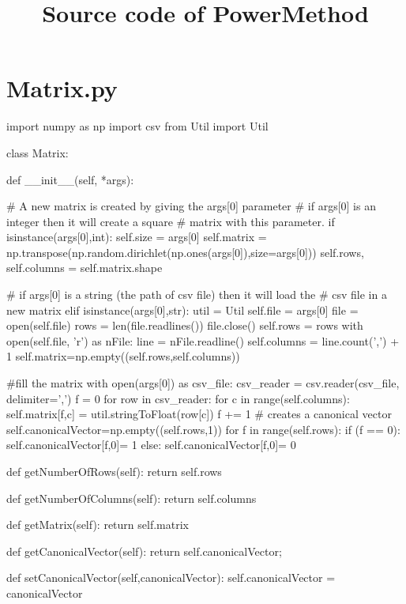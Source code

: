 \documentclass[12pt,a4paper]{article}
\begin{document}
	
	\title{Source code of PowerMethod}
	\maketitle

\section{Matrix.py}

\begin{python}
import numpy as np
import csv
from Util import Util

class Matrix:

def __init__(self, *args):

	# A new matrix is created by giving the args[0] parameter
	# if args[0] is an integer then it will create a square
	# matrix with this parameter.
	if isinstance(args[0],int):
		self.size = args[0]
		self.matrix = np.transpose(np.random.dirichlet(np.ones(args[0]),size=args[0]))
		self.rows, self.columns = self.matrix.shape
		
	# if args[0] is a string (the path of csv file) then it will load the
	# csv file in a new matrix
	elif isinstance(args[0],str):
		util = Util
		self.file = args[0]
		file = open(self.file)
		rows = len(file.readlines())
		file.close()
		self.rows = rows
		with open(self.file, 'r') as nFile:
			line = nFile.readline()
			self.columns = line.count(',') + 1 
			self.matrix=np.empty((self.rows,self.columns))
	
		#fill the matrix 
		with open(args[0]) as csv_file:
			csv_reader = csv.reader(csv_file, delimiter=',')
			f = 0
			for row in csv_reader:
				for c in range(self.columns):
					self.matrix[f,c] = util.stringToFloat(row[c])
				f += 1
	# creates a canonical vector
	self.canonicalVector=np.empty((self.rows,1))
	for f in range(self.rows):
		if (f == 0):
			self.canonicalVector[f,0]= 1
		else:
			self.canonicalVector[f,0]= 0   

def getNumberOfRows(self):
	return self.rows

def getNumberOfColumns(self):
	return self.columns

def getMatrix(self):
	return self.matrix

def getCanonicalVector(self):
	return self.canonicalVector;

def setCanonicalVector(self,canonicalVector):
	self.canonicalVector = canonicalVector

\end{python}
\end{document}
